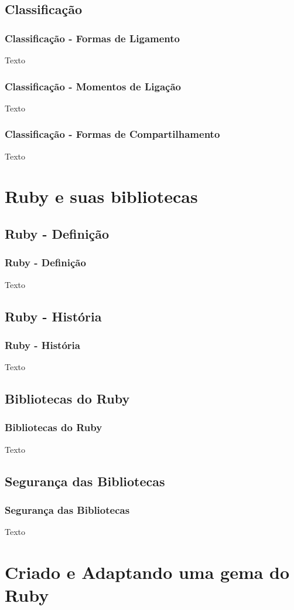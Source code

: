 \documentclass[10pt]{beamer}
\begin{document}
 \subsection{Classificação}
\begin{frame}
 \frametitle{Classificação - Formas de Ligamento}
 Texto
\end{frame}

\begin{frame}
 \frametitle{Classificação - Momentos de Ligação}
 Texto
\end{frame}

\begin{frame}
 \frametitle{Classificação - Formas de Compartilhamento}
 Texto
\end{frame}

\section{Ruby e suas bibliotecas}
 \subsection{Ruby - Definição} 
\begin{frame}
 \frametitle{Ruby - Definição}
 Texto
\end{frame}

\subsection{Ruby - História} 
\begin{frame}
 \frametitle{Ruby - História}
 Texto
\end{frame}


\subsection{Bibliotecas do Ruby} 
\begin{frame}
 \frametitle{Bibliotecas do Ruby}
 Texto
\end{frame}

\subsection{Segurança das Bibliotecas} 
\begin{frame}
 \frametitle{Segurança das Bibliotecas}
 Texto
\end{frame}

\section{Criado e Adaptando uma gema do Ruby}
\end{document}
